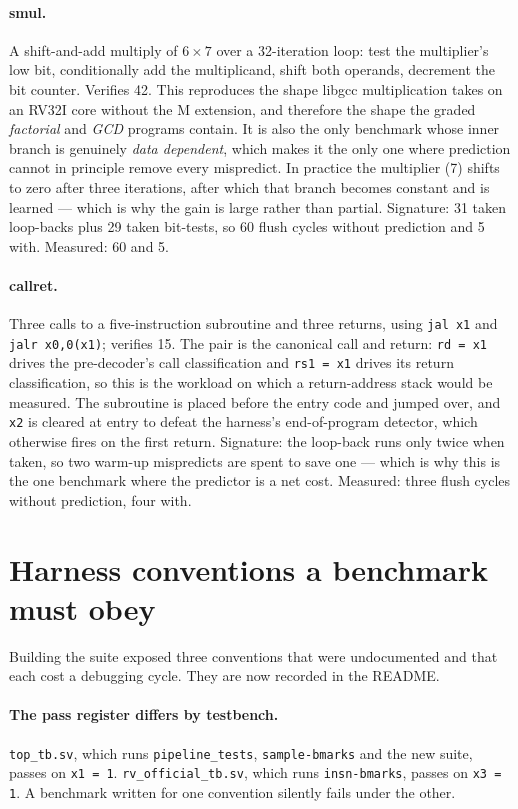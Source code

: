 \documentclass[11pt]{article}
\begin{document}
\paragraph{smul.} A shift-and-add multiply of $6\times 7$ over a 32-iteration loop: test
the multiplier's low bit, conditionally add the multiplicand, shift both operands, decrement
the bit counter. Verifies 42.
This reproduces the shape libgcc multiplication takes on an RV32I core without the M
extension, and therefore the shape the graded \emph{factorial} and \emph{GCD} programs
contain. It is also the only benchmark whose inner branch is genuinely \emph{data
dependent}, which makes it the only one where prediction cannot in principle remove every
mispredict. In practice the multiplier (7) shifts to zero after three iterations, after
which that branch becomes constant and is learned --- which is why the gain is large rather
than partial.
Signature: 31 taken loop-backs plus 29 taken bit-tests, so 60 flush cycles without
prediction and 5 with. Measured: 60 and 5.

\paragraph{callret.} Three calls to a five-instruction subroutine and three returns, using
\texttt{jal x1} and \texttt{jalr x0,0(x1)}; verifies 15.
The pair is the canonical call and return: \texttt{rd = x1} drives the pre-decoder's call
classification and \texttt{rs1 = x1} drives its return classification, so this is the
workload on which a return-address stack would be measured. The subroutine is placed before
the entry code and jumped over, and \texttt{x2} is cleared at entry to defeat the harness's
end-of-program detector, which otherwise fires on the first return.
Signature: the loop-back runs only twice when taken, so two warm-up mispredicts are spent to
save one --- which is why this is the one benchmark where the predictor is a net cost.
Measured: three flush cycles without prediction, four with.

\section{Harness conventions a benchmark must obey}

Building the suite exposed three conventions that were undocumented and that each cost
a debugging cycle. They are now recorded in the README.

\paragraph{The pass register differs by testbench.} \texttt{top\_tb.sv}, which runs
\texttt{pipeline\_tests}, \texttt{sample-bmarks} and the new suite, passes on
\texttt{x1 = 1}. \texttt{rv\_official\_tb.sv}, which runs \texttt{insn-bmarks}, passes
on \texttt{x3 = 1}. A benchmark written for one convention silently fails under the
other.
\end{document}
